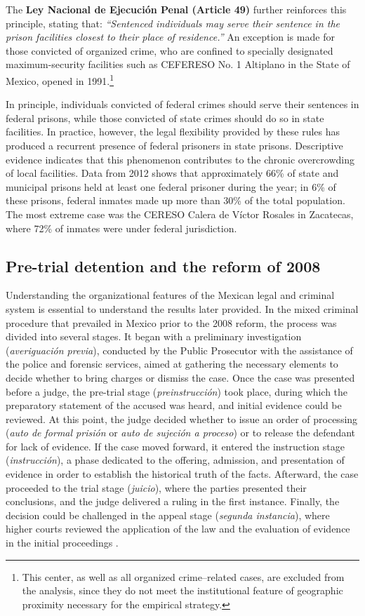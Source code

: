 The \textbf{Ley Nacional de Ejecución Penal (Article 49)} further reinforces this principle, stating that: \textit{“Sentenced individuals may serve their sentence in the prison facilities closest to their place of residence.”} An exception is made for those convicted of organized crime, who are confined to specially designated maximum-security facilities such as CEFERESO No. 1 Altiplano in the State of Mexico, opened in 1991.\footnote{This center, as well as all organized crime–related cases, are excluded from the analysis, since they do not meet the institutional feature of geographic proximity necessary for the empirical strategy.}  

In principle, individuals convicted of federal crimes should serve their sentences in federal prisons, while those convicted of state crimes should do so in state facilities. In practice, however, the legal flexibility provided by these rules has produced a recurrent presence of federal prisoners in state prisons. Descriptive evidence indicates that this phenomenon contributes to the chronic overcrowding of local facilities. Data from 2012 shows that approximately 66\% of state and municipal prisons held at least one federal prisoner during the year; in 6\% of these prisons, federal inmates made up more than 30\% of the total population. The most extreme case was the CERESO Calera de Víctor Rosales in Zacatecas, where 72\% of inmates were under federal jurisdiction. 

\subsection*{Pre-trial detention and the reform of 2008}

Understanding the organizational features of the Mexican legal and criminal system is essential to understand the results later provided. In the mixed criminal procedure that prevailed in Mexico prior to the 2008 reform, the process was divided into several stages. It began with a preliminary investigation (\textit{averiguación previa}), conducted by the Public Prosecutor with the assistance of the police and forensic services, aimed at gathering the necessary elements to decide whether to bring charges or dismiss the case. Once the case was presented before a judge, the pre-trial stage (\textit{preinstrucción}) took place, during which the preparatory statement of the accused was heard, and initial evidence could be reviewed. At this point, the judge decided whether to issue an order of processing (\textit{auto de formal prisión} or \textit{auto de sujeción a proceso}) or to release the defendant for lack of evidence. If the case moved forward, it entered the instruction stage (\textit{instrucción}), a phase dedicated to the offering, admission, and presentation of evidence in order to establish the historical truth of the facts. Afterward, the case proceeded to the trial stage (\textit{juicio}), where the parties presented their conclusions, and the judge delivered a ruling in the first instance. Finally, the decision could be challenged in the appeal stage (\textit{segunda instancia}), where higher courts reviewed the application of the law and the evaluation of evidence in the initial proceedings \citep{cossio2015formalprision}. 


